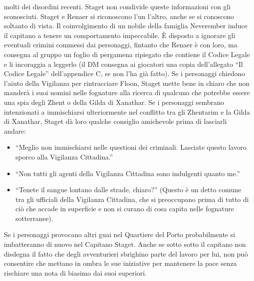 \documentclass{article}
\begin{document}
molti dei disordini recenti. Staget non condivide queste
informazioni con gli sconosciuti.
Staget e Renaer si riconoscono l’un l’altro, anche se si
conoscono soltanto di vista. Il coinvolgimento di un nobile
della famiglia Neverember induce il capitano a tenere
un comportamento impeccabile. È disposto a ignorare
gli eventuali crimini commessi dai personaggi, fintanto
che Renaer è con loro, ma consegna al gruppo un foglio
di pergamena ripiegato che contiene il Codice Legale e
li incoraggia a leggerlo (il DM consegna ai giocatori una
copia dell'allegato “Il Codice Legale” dell’appendice C, se
non l’ha già fatto).
Se i personaggi chiedono l'aiuto della Vigilanza per
rintracciare Floon, Staget mette bene in chiaro che non
manderà i suoi uomini nelle fognature alla ricerca di
qualcuno che potrebbe essere una spia degli Zhent o della
Gilda di Xanathar. Se i personaggi sembrano intenzionati a
immischiarsi ulteriormente nel conflitto tra gli Zhentarim
e la Gilda di Xanathar, Staget dà loro qualche consiglio
amichevole prima di lasciarli andare: 

\begin{itemize}
    \item “Meglio non immischiarsi nelle questioni dei criminali.
    Lasciate questo lavoro sporco alla Vigilanza Cittadina.”
    \item “Non tutti gli agenti della Vigilanza Cittadina sono
    indulgenti quanto me.”
    \item “Tenete il sangue lontano dalle strade, chiaro?” (Questo è
    un detto comune tra gli ufficiali della Vigilanza Cittadina,
    che si preoccupano prima di tutto di ciò che accade in
    superficie e non si curano di cosa capita nelle fognature
    sotterranee).
\end{itemize}

Se i personaggi provocano altri guai nel Quartiere del
Porto probabilmente si imbatteranno di nuovo nel Capitano
Staget. Anche se sotto sotto il capitano non disdegna il fatto
che degli avventurieri sbrighino parte del lavoro per lui,
non può consentire che mettano in ombra le sue iniziative
per mantenere la pace senza rischiare una nota di biasimo
dai suoi superiori.
 
\end{document}
